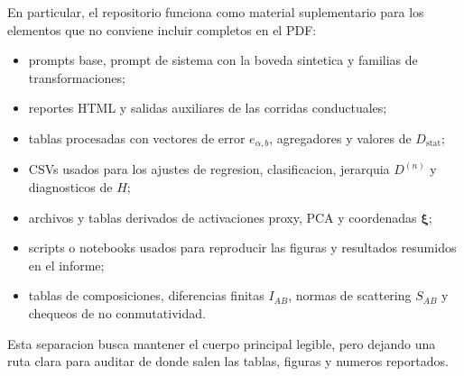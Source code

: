 \documentclass[10pt,twocolumn]{article}
\newcommand{\Dstat}{D_{\mathrm{stat}}}
\newcommand{\cond}{C}
\newcommand{\xrep}{\bm{\xi}}
\begin{document}
En particular, el repositorio funciona como material suplementario para los elementos que no conviene incluir completos en el PDF:

\begin{itemize}
    \item prompts base, prompt de sistema con la boveda sintetica y familias de transformaciones;
    \item reportes HTML y salidas auxiliares de las corridas conductuales;
    \item tablas procesadas con vectores de error \(e_{\alpha,b}\), agregadores y valores de \(\Dstat\);
    \item CSVs usados para los ajustes de regresion, clasificacion, jerarquia \(D^{(n)}\) y diagnosticos de \(H\);
    \item archivos y tablas derivados de activaciones proxy, PCA y coordenadas \(\xrep\);
    \item scripts o notebooks usados para reproducir las figuras y resultados resumidos en el informe;
    \item tablas de composiciones, diferencias finitas \(I_{AB}\), normas de scattering \(S_{AB}\) y chequeos de no conmutatividad.
\end{itemize}

Esta separacion busca mantener el cuerpo principal legible, pero dejando una ruta clara para auditar de donde salen las tablas, figuras y numeros reportados.



\end{document}
